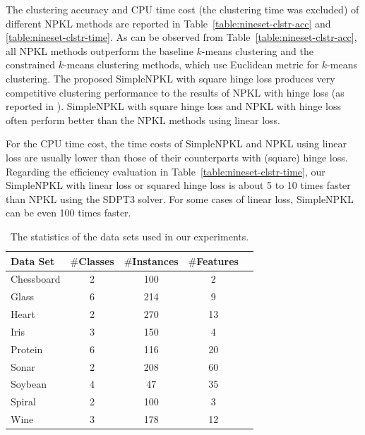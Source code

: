 The clustering accuracy and CPU time cost (the clustering time was excluded) of different NPKL methods are reported in Table~\ref{table:nineset-clstr-acc} and \ref{table:nineset-clstr-time}. As can be observed from
Table~\ref{table:nineset-clstr-acc}, all NPKL methods outperform the baseline $k$-means clustering and the constrained $k$-means clustering methods, which use Euclidean metric for $k$-means clustering. The proposed SimpleNPKL with square hinge loss produces very competitive clustering performance to the results of NPKL with hinge loss (as reported in \cite{icml/HoiJL07}). SimpleNPKL with square hinge loss and NPKL with hinge loss often perform better than the NPKL methods using linear loss.

For the CPU time cost, the time costs of SimpleNPKL and NPKL using linear loss are usually lower than those of their counterparts with (square) hinge loss. Regarding the efficiency evaluation in Table~\ref{table:nineset-clstr-time}, our SimpleNPKL with linear loss or squared hinge loss is about 5 to 10 times faster than NPKL using the SDPT3 solver. For some cases of linear loss, SimpleNPKL can be even 100 times faster.

\begin{table}[t]
\begin{center}
\begin{tabular}{l|cccr}
\hline %
Data Set &$\#$Classes &$\#$Instances &$\#$Features\\
\hline %
Chessboard  &2 &100 &2\\
Glass   &6 &214 &9\\
Heart &2 &270   &13\\
Iris &3 &150 &4\\
Protein &6 &116 &20\\
Sonar &2 &208 &60\\
Soybean &4 &47 &35\\
Spiral &2 &100 &3\\
Wine &3 &178 &12\\
\hline
\end{tabular}
\end{center}
\vspace{-0.2in}
\centering \caption{The statistics of the data sets used in our
experiments. } \label{table:data-set}
\end{table}

